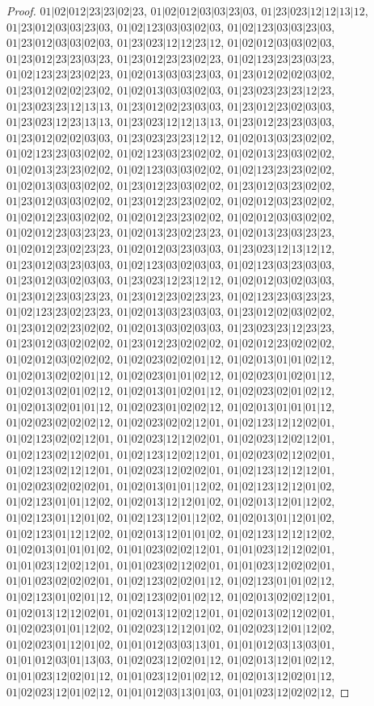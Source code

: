 \documentclass[12pt]{article}
\theoremstyle{plain}
\theoremstyle{definition}
\theoremstyle{remark}
\begin{document}
\begin{proof}
$01|02|012|23|23|02|23$, $01|02|012|03|03|23|03$, $01|23|023|12|12|13|12$, $01|23|012|03|03|23|03$, $01|02|123|03|03|02|03$, $01|02|123|03|03|23|03$, $01|23|012|03|03|02|03$, $01|23|023|12|12|23|12$, $01|02|012|03|03|02|03$, $01|23|012|23|23|03|23$, $01|23|012|23|23|02|23$, $01|02|123|23|23|03|23$, $01|02|123|23|23|02|23$, $01|02|013|03|03|23|03$, $01|23|012|02|02|03|02$, $01|23|012|02|02|23|02$, $01|02|013|03|03|02|03$, $01|23|023|23|23|12|23$, $01|23|023|23|12|13|13$, $01|23|012|02|23|03|03$, $01|23|012|23|02|03|03$, $01|23|023|12|23|13|13$, $01|23|023|12|12|13|13$, $01|23|012|23|23|03|03$, $01|23|012|02|02|03|03$, $01|23|023|23|23|12|12$, $01|02|013|03|23|02|02$, $01|02|123|23|03|02|02$, $01|02|123|03|23|02|02$, $01|02|013|23|03|02|02$, $01|02|013|23|23|02|02$, $01|02|123|03|03|02|02$, $01|02|123|23|23|02|02$, $01|02|013|03|03|02|02$, $01|23|012|23|03|02|02$, $01|23|012|03|23|02|02$, $01|23|012|03|03|02|02$, $01|23|012|23|23|02|02$, $01|02|012|03|23|02|02$, $01|02|012|23|03|02|02$, $01|02|012|23|23|02|02$, $01|02|012|03|03|02|02$, $01|02|012|23|03|23|23$, $01|02|013|23|02|23|23$, $01|02|013|23|03|23|23$, $01|02|012|23|02|23|23$, $01|02|012|03|23|03|03$, $01|23|023|12|13|12|12$, $01|23|012|03|23|03|03$, $01|02|123|03|02|03|03$, $01|02|123|03|23|03|03$, $01|23|012|03|02|03|03$, $01|23|023|12|23|12|12$, $01|02|012|03|02|03|03$, $01|23|012|23|03|23|23$, $01|23|012|23|02|23|23$, $01|02|123|23|03|23|23$, $01|02|123|23|02|23|23$, $01|02|013|03|23|03|03$, $01|23|012|02|03|02|02$, $01|23|012|02|23|02|02$, $01|02|013|03|02|03|03$, $01|23|023|23|12|23|23$, $01|23|012|03|02|02|02$, $01|23|012|23|02|02|02$, $01|02|012|23|02|02|02$, $01|02|012|03|02|02|02$, $01|02|023|02|02|01|12$, $01|02|013|01|01|02|12$, $01|02|013|02|02|01|12$, $01|02|023|01|01|02|12$, $01|02|023|01|02|01|12$, $01|02|013|02|01|02|12$, $01|02|013|01|02|01|12$, $01|02|023|02|01|02|12$, $01|02|013|02|01|01|12$, $01|02|023|01|02|02|12$, $01|02|013|01|01|01|12$, $01|02|023|02|02|02|12$, $01|02|023|02|02|12|01$, $01|02|123|12|12|02|01$, $01|02|123|02|02|12|01$, $01|02|023|12|12|02|01$, $01|02|023|12|02|12|01$, $01|02|123|02|12|02|01$, $01|02|123|12|02|12|01$, $01|02|023|02|12|02|01$, $01|02|123|02|12|12|01$, $01|02|023|12|02|02|01$, $01|02|123|12|12|12|01$, $01|02|023|02|02|02|01$, $01|02|013|01|01|12|02$, $01|02|123|12|12|01|02$, $01|02|123|01|01|12|02$, $01|02|013|12|12|01|02$, $01|02|013|12|01|12|02$, $01|02|123|01|12|01|02$, $01|02|123|12|01|12|02$, $01|02|013|01|12|01|02$, $01|02|123|01|12|12|02$, $01|02|013|12|01|01|02$, $01|02|123|12|12|12|02$, $01|02|013|01|01|01|02$, $01|01|023|02|02|12|01$, $01|01|023|12|12|02|01$, $01|01|023|12|02|12|01$, $01|01|023|02|12|02|01$, $01|01|023|12|02|02|01$, $01|01|023|02|02|02|01$, $01|02|123|02|02|01|12$, $01|02|123|01|01|02|12$, $01|02|123|01|02|01|12$, $01|02|123|02|01|02|12$, $01|02|013|02|02|12|01$, $01|02|013|12|12|02|01$, $01|02|013|12|02|12|01$, $01|02|013|02|12|02|01$, $01|02|023|01|01|12|02$, $01|02|023|12|12|01|02$, $01|02|023|12|01|12|02$, $01|02|023|01|12|01|02$, $01|01|012|03|03|13|01$, $01|01|012|03|13|03|01$, $01|01|012|03|01|13|03$, $01|02|023|12|02|01|12$, $01|02|013|12|01|02|12$, $01|01|023|12|02|01|12$, $01|01|023|12|01|02|12$, $01|02|013|12|02|01|12$, $01|02|023|12|01|02|12$, $01|01|012|03|13|01|03$, $01|01|023|12|02|02|12$, 
\end{proof}
\end{document}
